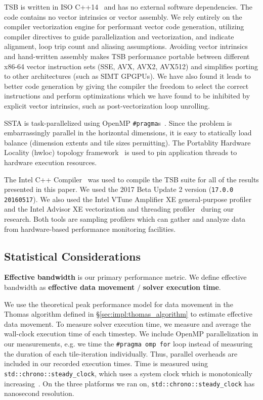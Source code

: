 \documentclass{sig-alternate}
\begin{document}
TSB is written in ISO C++14~\cite{cxx14_spec} and has no external software
  dependencies.
The code contains no vector intrinsics or vector assembly.
We rely entirely on the compiler vectorization engine for performant vector
  code generation, utilizing compiler directives to guide parallelization and
  vectorization, and indicate alignment, loop trip count and aliasing
  assumptions.
Avoiding vector intrinsics and hand-written assembly makes TSB performance
  portable between different x86-64 vector instruction sets (SSE, AVX, AVX2,
  AVX512) and simplifies porting to other architectures (such as SIMT GPGPUs).
We have also found it leads to better code generation by giving the compiler
  the freedom to select the correct instructions and perform optimizations which
  we have found to be inhibited by explicit vector intrinsics, such as
  post-vectorization loop unrolling.

SSTA is task-parallelized using OpenMP \lstinline{#pragma}s~\cite{openmp_spec}.
Since the problem is embarrassingly parallel in the horizontal dimensions, it
  is easy to statically load balance (dimension extents and tile sizes
  permitting).
The Portablity Hardware Locality (hwloc) topology
  framework~\cite{hwloc} is used to pin application threads to hardware execution
  resources.

The Intel C++ Compiler~\cite{intel_cpp_compiler} was used to compile the TSB
  suite for all of the results presented in this paper.
We used the 2017 Beta Update 2 version (\lstinline{17.0.0 20160517}).
We also used the Intel VTune Amplifier XE general-purpose
  profiler~\cite{intel_vtune_amplifier} and the Intel Advisor XE vectorization
  and threading profiler~\cite{intel_advisor} during our research.
Both tools are sampling profilers which can gather and analyze data from
  hardware-based performance monitoring facilities.

\subsection{Statistical Considerations}
\label{sec:setup:stats}

\textbf{Effective bandwidth} is our primary performance metric.
We define effective bandwidth as \textbf{effective data movement} \(/\)
  \textbf{solver execution time}.

We use the theoretical peak performance model for data movement in the Thomas
  algorithm defined in \S\ref{sec:impl:thomas_algorithm} to estimate
  effective data movement.
To measure solver execution time, we measure and average the wall-clock
  execution time of each timestep. 
We include OpenMP parallelization in our measurements, e.g. we time the
  \lstinline{#pragma omp for} loop instead of measuring the duration of each
  tile-iteration individually.
Thus, parallel overheads are included in our recorded execution times.
Time is measured using \lstinline{std::chrono::steady_clock}, which uses a
  system clock which is monotonically increasing~\cite{cppreference_chrono_steady_clock}.
On the three platforms we ran on, \lstinline{std::chrono::steady_clock} has
  nanosecond resolution.
\end{document}
